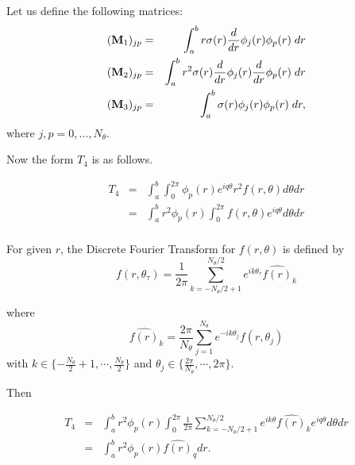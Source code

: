 Let us define the following matrices:
\begin{eqnarray}
({\bf M}_1)_{jp} & = & \int_a^b r \sigma(r) \frac{d}{dr} \phi_j(r) \phi_p(r) \;dr  \\
({\bf M}_2)_{jp} & = & \int_a^b r^2 \sigma(r) \frac{d}{dr} \phi_j(r) \frac{d}{dr} \phi_p(r) \;dr  \\
({\bf M}_3)_{jp} & = & \int_a^b \sigma(r) \phi_j(r) \phi_p(r) \; dr,
\end{eqnarray}
where $j, p = 0, \ldots, N_\theta$.

Now the form $T_4$ is as follows.

\begin{eqnarray}
T_4 &=& \int_a^b \int_0^{2\pi} \phi_p(r) e^{iq\theta} r^2 f(r,\theta) d\theta dr \\
    &=& \int_a^b r^2\phi_p(r) \int_0^{2\pi} f(r,\theta) e^{iq\theta} d\theta dr \\
\end{eqnarray}

For given $r$, the Discrete Fourier Transform for $f(r, \theta)$ is defined by
\begin{equation}
f(r, \theta_\tau) = \frac{1}{2\pi} \sum_{k=-N_\theta/2+1}^{N_\theta/2} e^{ik\theta_\tau} \widehat{f(r)}_k
\end{equation}

where
\begin{equation}
\widehat{f(r)}_k = \frac{2\pi}{N_\theta} \sum_{j=1}^{N_\theta} e^{-ik\theta_j} f(r, \theta_j)
\end{equation}
with $ k \in \{-\frac{N_\theta}{2}+1, \cdots, \frac{N_\theta}{2}\}$ and $\theta_j \in \{ \frac{2\pi}{N_\theta}, \cdots, 2\pi  \}$.  

Then
\begin{center}
\begin{eqnarray}
T_4&=& \int_a^b r^2\phi_p(r) \int_0^{2\pi} \frac{1}{2\pi} \sum_{k=-N_\theta/2+1}^{N_\theta/2} e^{ik\theta} \widehat{f(r)}_k e^{iq\theta} d\theta dr \\
&=& \int_a^b r^2\phi_p(r) \widehat{f(r)}_q dr.
\end{eqnarray}
\end{center}


